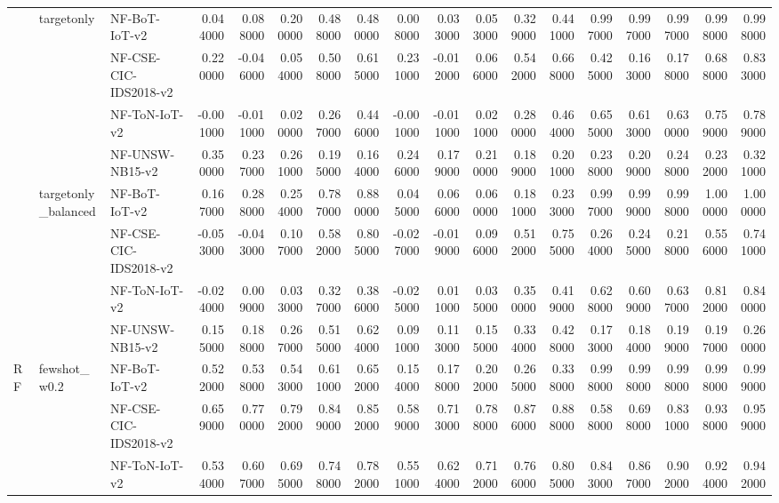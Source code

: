 \begin{tabular}{lllrrrrrrrrrrrrrrr}
\cline{2-18}
 & \multirow[t]{4}{*}{targetonly} & NF-BoT-IoT-v2 & 0.044000 & 0.088000 & 0.200000 & 0.488000 & 0.480000 & 0.008000 & 0.033000 & 0.053000 & 0.329000 & 0.441000 & 0.997000 & 0.997000 & 0.997000 & 0.998000 & 0.998000 \\
 &  & NF-CSE-CIC-IDS2018-v2 & 0.220000 & -0.046000 & 0.054000 & 0.508000 & 0.615000 & 0.231000 & -0.012000 & 0.066000 & 0.542000 & 0.668000 & 0.425000 & 0.163000 & 0.178000 & 0.688000 & 0.833000 \\
 &  & NF-ToN-IoT-v2 & -0.001000 & -0.011000 & 0.020000 & 0.267000 & 0.446000 & -0.001000 & -0.011000 & 0.021000 & 0.280000 & 0.464000 & 0.655000 & 0.613000 & 0.630000 & 0.759000 & 0.789000 \\
 &  & NF-UNSW-NB15-v2 & 0.350000 & 0.237000 & 0.261000 & 0.195000 & 0.164000 & 0.246000 & 0.179000 & 0.210000 & 0.189000 & 0.201000 & 0.238000 & 0.209000 & 0.248000 & 0.232000 & 0.321000 \\
\cline{2-18}
 & \multirow[t]{4}{*}{targetonly_balanced} & NF-BoT-IoT-v2 & 0.167000 & 0.288000 & 0.254000 & 0.787000 & 0.880000 & 0.045000 & 0.066000 & 0.060000 & 0.181000 & 0.233000 & 0.997000 & 0.999000 & 0.998000 & 1.000000 & 1.000000 \\
 &  & NF-CSE-CIC-IDS2018-v2 & -0.053000 & -0.043000 & 0.107000 & 0.582000 & 0.805000 & -0.027000 & -0.019000 & 0.096000 & 0.512000 & 0.755000 & 0.264000 & 0.245000 & 0.218000 & 0.556000 & 0.741000 \\
 &  & NF-ToN-IoT-v2 & -0.024000 & 0.009000 & 0.033000 & 0.327000 & 0.386000 & -0.025000 & 0.011000 & 0.035000 & 0.350000 & 0.419000 & 0.628000 & 0.609000 & 0.637000 & 0.812000 & 0.840000 \\
 &  & NF-UNSW-NB15-v2 & 0.155000 & 0.188000 & 0.267000 & 0.515000 & 0.624000 & 0.091000 & 0.113000 & 0.155000 & 0.334000 & 0.428000 & 0.173000 & 0.184000 & 0.199000 & 0.197000 & 0.260000 \\
\cline{1-18} \cline{2-18}
\multirow[t]{24}{*}{RF} & \multirow[t]{4}{*}{fewshot_w0.2} & NF-BoT-IoT-v2 & 0.522000 & 0.538000 & 0.543000 & 0.611000 & 0.652000 & 0.154000 & 0.178000 & 0.202000 & 0.265000 & 0.338000 & 0.998000 & 0.998000 & 0.998000 & 0.998000 & 0.999000 \\
 &  & NF-CSE-CIC-IDS2018-v2 & 0.659000 & 0.770000 & 0.792000 & 0.849000 & 0.852000 & 0.589000 & 0.713000 & 0.788000 & 0.876000 & 0.888000 & 0.588000 & 0.698000 & 0.831000 & 0.938000 & 0.959000 \\
 &  & NF-ToN-IoT-v2 & 0.534000 & 0.607000 & 0.695000 & 0.748000 & 0.782000 & 0.551000 & 0.624000 & 0.712000 & 0.766000 & 0.805000 & 0.843000 & 0.867000 & 0.902000 & 0.924000 & 0.942000 \\

\end{tabular}
